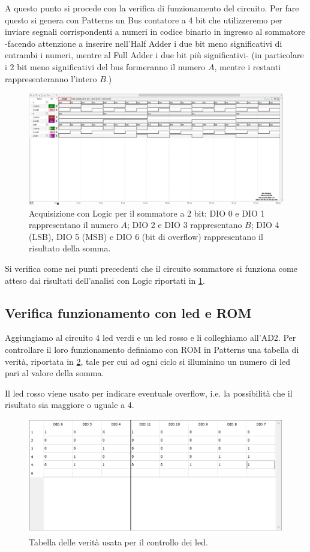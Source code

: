 \documentclass[10pt, a4paper, italian]{article}
\begin{document}
A questo punto si procede con la verifica di funzionamento del circuito.
Per fare questo si genera con Patterns un Bus contatore a 4 bit che
utilizzeremo per inviare segnali corrispondenti a numeri in codice binario in
ingresso al sommatore -facendo attenzione a inserire nell'Half Adder i due
bit meno significativi di entrambi i numeri, mentre al Full Adder i due bit
più significativi- (in particolare i 2 bit meno significativi del bus
formeranno il numero $A$, mentre i restanti rappresenteranno l'intero $B$.)
\begin{figure}[htbp]
    \centering
    \includegraphics[width=\linewidth]{sum_time.png}
    \caption{Acquisizione con Logic per il sommatore a 2 bit: DIO 0 e DIO 1
    rappresentano il numero $A$; DIO 2 e DIO 3 rappresentano $B$; DIO 4 (LSB),
    DIO 5 (MSB) e DIO 6 (bit di overflow) rappresentano il risultato della
    somma.}
    \label{fig: faAD2}
\end{figure}
Si verifica come nei punti precedenti che il circuito sommatore si funziona
come atteso dai risultati dell'analisi con Logic riportati in
\cref{fig: faAD2}.

\subsection{Verifica funzionamento con led e ROM}
Aggiungiamo al circuito 4 led verdi e un led rosso e li colleghiamo all'AD2.
Per controllare il loro funzionamento definiamo con ROM in Patterns una
tabella di verità, riportata in \cref{fig: Ver}, tale per cui ad ogni ciclo
si illuminino un numero di led pari al valore della somma.

Il led rosso viene usato per indicare eventuale overflow, i.e. la possibilità
che il risultato sia maggiore o uguale a 4.
\begin{figure}[htbp]
    \centering
    \includegraphics[width=0.8\linewidth]{TAB_LED}
    \caption{Tabella delle verità usata per il controllo dei led.
    \label{fig: Ver}}
\end{figure}
\end{document}
